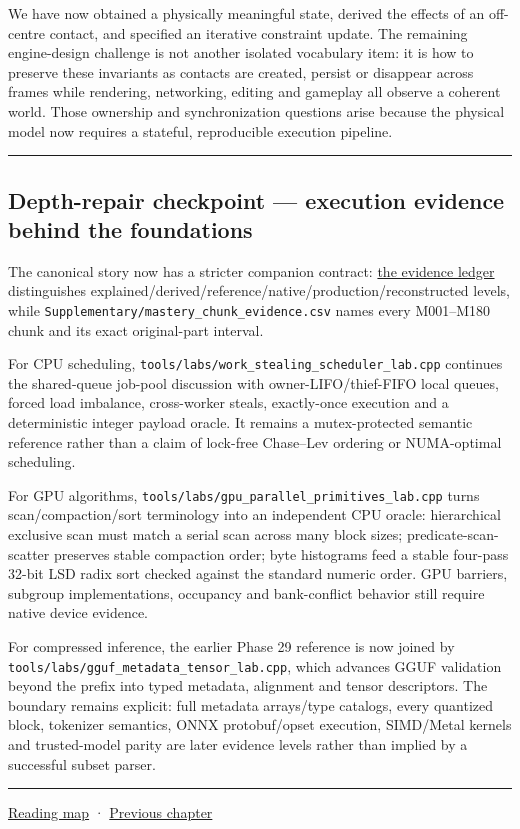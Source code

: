 We have now obtained a physically meaningful state, derived the effects of an off-centre contact, and specified an iterative constraint update. The remaining engine-design challenge is not another isolated vocabulary item: it is how to preserve these invariants as contacts are created, persist or disappear across frames while rendering, networking, editing and gameplay all observe a coherent world. Those ownership and synchronization questions arise because the physical model now requires a stateful, reproducible execution pipeline.

\begin{center}\rule{0.5\linewidth}{0.5pt}\end{center}

\subsection{Depth-repair checkpoint --- execution evidence behind the foundations}\label{02-foundations-ii-ch039-depth-repair-checkpoint-execution-evidence-behind-the-foundations}

The canonical story now has a stricter companion contract: \hyperref[appendix-2358b21a702d]{the evidence ledger} distinguishes explained/derived/reference/native/production/reconstructed levels, while \texttt{Supplementary/mastery\_chunk\_evidence.csv} names every M001--M180 chunk and its exact original-part interval.

For CPU scheduling, \texttt{tools/labs/work\_stealing\_scheduler\_lab.cpp} continues the shared-queue job-pool discussion with owner-LIFO/thief-FIFO local queues, forced load imbalance, cross-worker steals, exactly-once execution and a deterministic integer payload oracle. It remains a mutex-protected semantic reference rather than a claim of lock-free Chase--Lev ordering or NUMA-optimal scheduling.

For GPU algorithms, \texttt{tools/labs/gpu\_parallel\_primitives\_lab.cpp} turns scan/compaction/sort terminology into an independent CPU oracle: hierarchical exclusive scan must match a serial scan across many block sizes; predicate-scan-scatter preserves stable compaction order; byte histograms feed a stable four-pass 32-bit LSD radix sort checked against the standard numeric order. GPU barriers, subgroup implementations, occupancy and bank-conflict behavior still require native device evidence.

For compressed inference, the earlier Phase 29 reference is now joined by \texttt{tools/labs/gguf\_metadata\_tensor\_lab.cpp}, which advances GGUF validation beyond the prefix into typed metadata, alignment and tensor descriptors. The boundary remains explicit: full metadata arrays/type catalogs, every quantized block, tokenizer semantics, ONNX protobuf/opset execution, SIMD/Metal kernels and trusted-model parity are later evidence levels rather than implied by a successful subset parser.

\begin{center}\rule{0.5\linewidth}{0.5pt}\end{center}

\hyperref[volume-reading-map]{Reading map} · \hyperref[02-foundations-ii-ch038-reconstruct-the-complete-geometry-pipeline]{Previous chapter}
